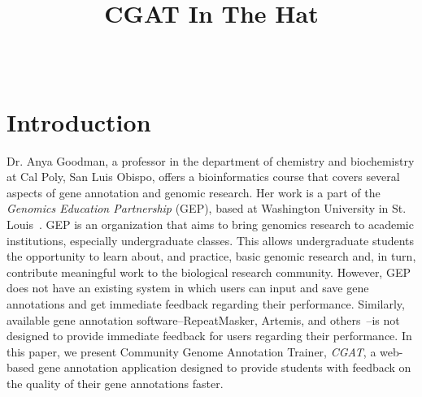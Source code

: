 \documentclass[10pt, conference, compsocconf]{IEEEtran}
\begin{document}
\title{CGAT In The Hat}


\author{
\\
}

\maketitle

\thispagestyle{empty}
\pagestyle{empty}

\section{Introduction}\label{sec:introduction}
Dr. Anya Goodman, a professor in the department of chemistry and biochemistry
at Cal Poly, San Luis Obispo, offers a bioinformatics course that covers
several aspects of gene annotation and genomic research. Her work is a part of
the \textit{Genomics Education Partnership} (GEP), based at Washington
University in St. Louis~\cite{gep}. GEP is an organization that aims to bring
genomics research to academic institutions, especially undergraduate classes.
This allows undergraduate students the opportunity to learn about, and
practice, basic genomic research and, in turn, contribute meaningful work to
the biological research community. However, GEP does not have an existing
system in which users can input and save gene annotations and get immediate
feedback regarding their performance. Similarly, available gene annotation
software--RepeatMasker, Artemis, and others~\cite{repeatmasker, artemis}--is
not designed to provide immediate feedback for users regarding their
performance. In this paper, we present Community Genome Annotation Trainer,
\textit{CGAT}, a web-based gene annotation application designed to provide
students with feedback on the quality of their gene annotations faster.
\end{document}
